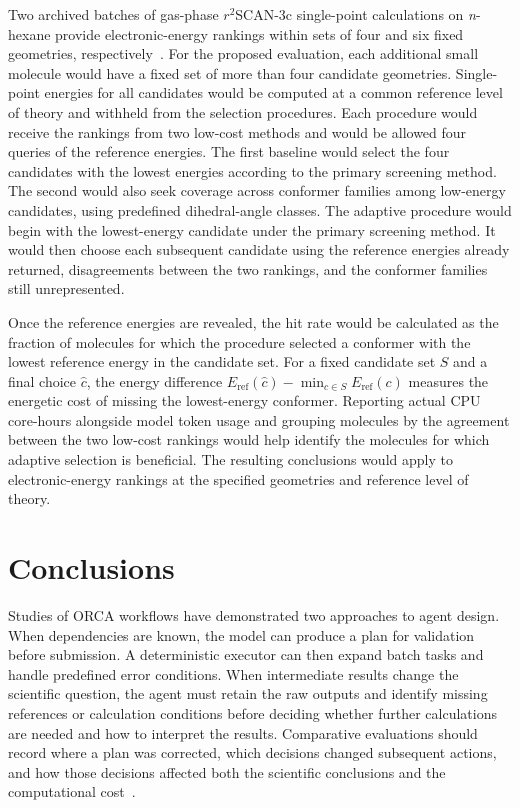 \documentclass[a4paper,11pt]{article}
\begin{document}
Two archived batches of gas-phase $r^2$SCAN-3c single-point calculations on
\emph{n}-hexane provide electronic-energy rankings within sets of four and six
fixed geometries, respectively~\cite{projectarchive}.
For the proposed evaluation, each additional small molecule would have a
fixed set of more than four candidate geometries.
Single-point energies for all candidates would be computed at a common
reference level of theory and withheld from the selection procedures.
Each procedure would receive the rankings from two low-cost methods and would
be allowed four queries of the reference energies.
The first baseline would select the four candidates with the lowest energies
according to the primary screening method.
The second would also seek coverage across conformer families among low-energy
candidates, using predefined dihedral-angle classes.
The adaptive procedure would begin with the lowest-energy candidate under the
primary screening method.
It would then choose each subsequent candidate using the reference energies
already returned, disagreements between the two rankings, and the conformer
families still unrepresented.

Once the reference energies are revealed, the hit rate would be calculated as
the fraction of molecules for which the procedure selected a conformer with
the lowest reference energy in the candidate set.
For a fixed candidate set $S$ and a final choice $\hat c$, the energy difference
$E_{\mathrm{ref}}(\hat c)-\min_{c\in S}E_{\mathrm{ref}}(c)$
measures the energetic cost of missing the lowest-energy conformer.
Reporting actual CPU core-hours alongside model token usage and grouping
molecules by the agreement between the two low-cost rankings would help
identify the molecules for which adaptive selection is beneficial.
The resulting conclusions would apply to electronic-energy rankings at the
specified geometries and reference level of theory.

\section{Conclusions}

Studies of ORCA workflows have demonstrated two approaches to agent design.
When dependencies are known, the model can produce a plan for validation
before submission.
A deterministic executor can then expand batch tasks and handle predefined
error conditions.
When intermediate results change the scientific question, the agent must
retain the raw outputs and identify missing references or calculation
conditions before deciding whether further calculations are needed and how
to interpret the results.
Comparative evaluations should record where a plan was corrected, which
decisions changed subsequent actions, and how those decisions affected both
the scientific conclusions and the computational cost~\cite{qplanner,agente,quntur}.
\end{document}
